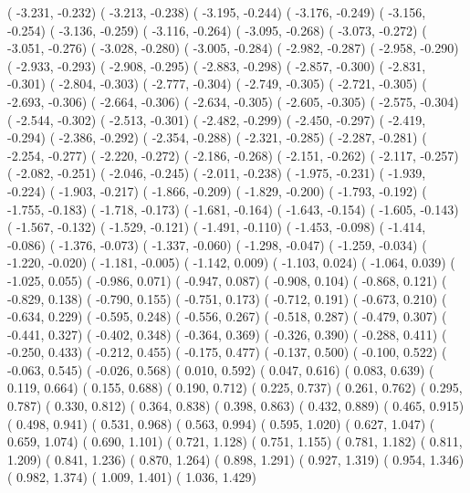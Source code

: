 {  ( -3.231,  -0.232)  ( -3.213,  -0.238)  ( -3.195,  -0.244)  ( -3.176,  -0.249)  ( -3.156,  -0.254)
  ( -3.136,  -0.259)  ( -3.116,  -0.264)  ( -3.095,  -0.268)  ( -3.073,  -0.272)  ( -3.051,  -0.276)
  ( -3.028,  -0.280)  ( -3.005,  -0.284)  ( -2.982,  -0.287)  ( -2.958,  -0.290)  ( -2.933,  -0.293)
  ( -2.908,  -0.295)  ( -2.883,  -0.298)  ( -2.857,  -0.300)  ( -2.831,  -0.301)  ( -2.804,  -0.303)
  ( -2.777,  -0.304)  ( -2.749,  -0.305)  ( -2.721,  -0.305)  ( -2.693,  -0.306)  ( -2.664,  -0.306)
  ( -2.634,  -0.305)  ( -2.605,  -0.305)  ( -2.575,  -0.304)  ( -2.544,  -0.302)  ( -2.513,  -0.301)
  ( -2.482,  -0.299)  ( -2.450,  -0.297)  ( -2.419,  -0.294)  ( -2.386,  -0.292)  ( -2.354,  -0.288)
  ( -2.321,  -0.285)  ( -2.287,  -0.281)  ( -2.254,  -0.277)  ( -2.220,  -0.272)  ( -2.186,  -0.268)
  ( -2.151,  -0.262)  ( -2.117,  -0.257)  ( -2.082,  -0.251)  ( -2.046,  -0.245)  ( -2.011,  -0.238)
  ( -1.975,  -0.231)  ( -1.939,  -0.224)  ( -1.903,  -0.217)  ( -1.866,  -0.209)  ( -1.829,  -0.200)
  ( -1.793,  -0.192)  ( -1.755,  -0.183)  ( -1.718,  -0.173)  ( -1.681,  -0.164)  ( -1.643,  -0.154)
  ( -1.605,  -0.143)  ( -1.567,  -0.132)  ( -1.529,  -0.121)  ( -1.491,  -0.110)  ( -1.453,  -0.098)
  ( -1.414,  -0.086)  ( -1.376,  -0.073)  ( -1.337,  -0.060)  ( -1.298,  -0.047)  ( -1.259,  -0.034)
  ( -1.220,  -0.020)  ( -1.181,  -0.005)  ( -1.142,   0.009)  ( -1.103,   0.024)  ( -1.064,   0.039)
  ( -1.025,   0.055)  ( -0.986,   0.071)  ( -0.947,   0.087)  ( -0.908,   0.104)  ( -0.868,   0.121)
  ( -0.829,   0.138)  ( -0.790,   0.155)  ( -0.751,   0.173)  ( -0.712,   0.191)  ( -0.673,   0.210)
  ( -0.634,   0.229)  ( -0.595,   0.248)  ( -0.556,   0.267)  ( -0.518,   0.287)  ( -0.479,   0.307)
  ( -0.441,   0.327)  ( -0.402,   0.348)  ( -0.364,   0.369)  ( -0.326,   0.390)  ( -0.288,   0.411)
  ( -0.250,   0.433)  ( -0.212,   0.455)  ( -0.175,   0.477)  ( -0.137,   0.500)  ( -0.100,   0.522)
  ( -0.063,   0.545)  ( -0.026,   0.568)  (  0.010,   0.592)  (  0.047,   0.616)  (  0.083,   0.639)
  (  0.119,   0.664)  (  0.155,   0.688)  (  0.190,   0.712)  (  0.225,   0.737)  (  0.261,   0.762)
  (  0.295,   0.787)  (  0.330,   0.812)  (  0.364,   0.838)  (  0.398,   0.863)  (  0.432,   0.889)
  (  0.465,   0.915)  (  0.498,   0.941)  (  0.531,   0.968)  (  0.563,   0.994)  (  0.595,   1.020)
  (  0.627,   1.047)  (  0.659,   1.074)  (  0.690,   1.101)  (  0.721,   1.128)  (  0.751,   1.155)
  (  0.781,   1.182)  (  0.811,   1.209)  (  0.841,   1.236)  (  0.870,   1.264)  (  0.898,   1.291)
  (  0.927,   1.319)  (  0.954,   1.346)  (  0.982,   1.374)  (  1.009,   1.401)  (  1.036,   1.429)
}
